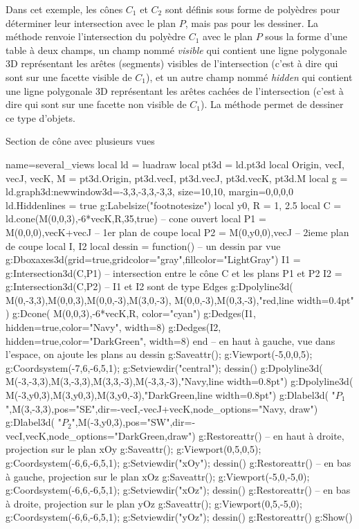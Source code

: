 Dans cet exemple, les cônes $C_1$ et $C_2$ sont définis sous forme de polyèdres pour déterminer leur intersection avec le plan $P$, mais pas pour les dessiner. La méthode  renvoie l'intersection du polyèdre $C_1$ avec le plan $P$ sous la forme d'une table à deux champs, un champ nommé \emph{visible} qui contient une ligne polygonale 3D représentant les arêtes (segments) visibles de l'intersection (c'est à dire qui sont sur une facette visible de $C_1$), et un autre champ nommé \emph{hidden} qui contient une ligne polygonale 3D représentant les arêtes cachées de l'intersection (c'est à dire qui sont sur une facette non visible de $C_1$). La méthode  permet de dessiner ce type d'objets.

\begin{demo}{Section de cône avec plusieurs vues}
\begin{luadraw}{name=several_views}
local ld = luadraw
local pt3d = ld.pt3d
local Origin, vecI, vecJ, vecK, M = pt3d.Origin, pt3d.vecI, pt3d.vecJ, pt3d.vecK, pt3d.M
local g = ld.graph3d:new{window3d={-3,3,-3,3,-3,3}, size={10,10}, margin={0,0,0,0}}
ld.Hiddenlines = true
g:Labelsize("footnotesize")
local y0, R = 1, 2.5
local C = ld.cone(M(0,0,3),-6*vecK,R,35,true) -- cone ouvert
local P1 = {M(0,0,0),vecK+vecJ} -- 1er plan de coupe
local P2 = {M(0,y0,0),vecJ} -- 2ieme plan de coupe
local I, I2
local dessin = function() -- un dessin par vue
    g:Dboxaxes3d({grid=true,gridcolor="gray",fillcolor="LightGray"})
    I1 = g:Intersection3d(C,P1) -- intersection entre le cône C et les plans P1 et P2
    I2 = g:Intersection3d(C,P2) -- I1 et I2 sont de type Edges
    g:Dpolyline3d( {{M(0,-3,3),M(0,0,3),M(0,0,-3),M(3,0,-3)}, {M(0,0,-3),M(0,3,-3)}},"red,line width=0.4pt" )
    g:Dcone( M(0,0,3),-6*vecK,R, {color="cyan"})
    g:Dedges(I1, {hidden=true,color="Navy", width=8})
    g:Dedges(I2, {hidden=true,color="DarkGreen", width=8})
end
-- en haut à gauche, vue dans l'espace, on ajoute les plans au dessin
g:Saveattr(); g:Viewport(-5,0,0,5); g:Coordsystem(-7,6,-6,5,1); g:Setviewdir("central"); dessin()
g:Dpolyline3d( {M(-3,-3,3),M(3,-3,3),M(3,3,-3),M(-3,3,-3)},"Navy,line width=0.8pt")
g:Dpolyline3d( {M(-3,y0,3),M(3,y0,3),M(3,y0,-3)},"DarkGreen,line width=0.8pt")
g:Dlabel3d( "$P_1$",M(3,-3,3),{pos="SE",dir={-vecI,-vecJ+vecK},node_options="Navy, draw"})
g:Dlabel3d( "$P_2$",M(-3,y0,3),{pos="SW",dir={-vecI,vecK},node_options="DarkGreen,draw"})
g:Restoreattr()
-- en haut à droite, projection sur le plan xOy
g:Saveattr(); g:Viewport(0,5,0,5); g:Coordsystem(-6,6,-6,5,1); g:Setviewdir("xOy"); dessin()
g:Restoreattr()
-- en bas à gauche, projection sur le plan xOz
g:Saveattr(); g:Viewport(-5,0,-5,0); g:Coordsystem(-6,6,-6,5,1); g:Setviewdir("xOz"); dessin()
g:Restoreattr()
-- en bas à droite, projection sur le plan yOz
g:Saveattr(); g:Viewport(0,5,-5,0); g:Coordsystem(-6,6,-6,5,1); g:Setviewdir("yOz"); dessin()
g:Restoreattr()
g:Show()
\end{luadraw}
\end{demo}

